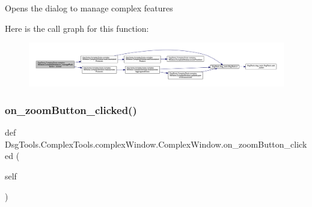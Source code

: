 \begin{DoxyVerb}Opens the dialog to manage complex features
\end{DoxyVerb}
 Here is the call graph for this function\+:
\nopagebreak
\begin{figure}[H]
\begin{center}
\leavevmode
\includegraphics[width=350pt]{class_dsg_tools_1_1_complex_tools_1_1complex_window_1_1_complex_window_acd28666ddddd5ff62cdf00531b484cf4_cgraph}
\end{center}
\end{figure}
\mbox{\label{class_dsg_tools_1_1_complex_tools_1_1complex_window_1_1_complex_window_a7a1f50dd24e8787d4f355318159d2183}} 
\subsubsection{\texorpdfstring{on\+\_\+zoom\+Button\+\_\+clicked()}{on\_zoomButton\_clicked()}}
{\footnotesize\ttfamily def Dsg\+Tools.\+Complex\+Tools.\+complex\+Window.\+Complex\+Window.\+on\+\_\+zoom\+Button\+\_\+clicked (\begin{DoxyParamCaption}\item[{}]{self }\end{DoxyParamCaption})}

